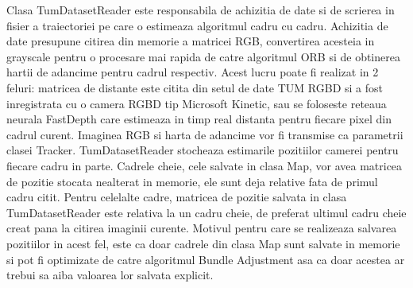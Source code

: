 \documentclass[12pt,a4paper]{report}
\begin{document}
Clasa TumDatasetReader este responsabila de achizitia de date si de scrierea 
in fisier a traiectoriei pe care o estimeaza algoritmul cadru cu cadru. Achizitia de date 
presupune citirea din memorie a matricei RGB, convertirea acesteia in grayscale pentru 
o procesare mai rapida de catre algoritmul ORB si de obtinerea hartii de adancime pentru 
cadrul respectiv. Acest lucru poate fi realizat in 2 feluri: matricea de distante este citita
din setul de date TUM RGBD si a fost inregistrata cu o camera RGBD tip Microsoft Kinetic,
sau se foloseste reteaua neurala FastDepth care estimeaza in timp real distanta pentru
fiecare pixel din cadrul curent. Imaginea RGB si harta de adancime
vor fi transmise ca parametrii clasei Tracker. TumDatasetReader stocheaza estimarile 
pozitiilor camerei pentru fiecare cadru in parte. Cadrele cheie, cele salvate 
in clasa Map, vor avea matricea de pozitie stocata nealterat in memorie, ele sunt deja relative 
fata de primul cadru citit. Pentru celelalte cadre, matricea de pozitie salvata in clasa
TumDatasetReader este relativa la un cadru cheie, de preferat ultimul cadru cheie creat pana
la citirea imaginii curente. Motivul pentru care se realizeaza salvarea pozitiilor in acest 
fel, este ca doar cadrele din clasa Map sunt salvate in memorie si pot fi optimizate 
de catre algoritmul Bundle Adjustment asa ca doar acestea ar trebui sa aiba valoarea lor 
salvata explicit. \\
\end{document}
